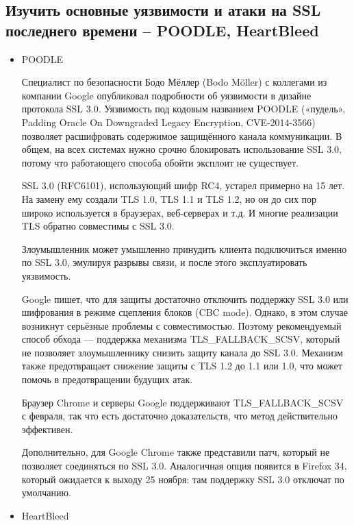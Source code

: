 \documentclass[11pt, a4paper]{article}		%
\begin{document}

\subsection{Изучить основные уязвимости и атаки на SSL последнего времени – POODLE, HeartBleed}

\begin{itemize}

\item POODLE 

Специалист по безопасности Бодо Мёллер (Bodo Möller) с коллегами из компании Google опубликовал подробности об уязвимости в дизайне протокола SSL 3.0. Уязвимость под кодовым названием POODLE («пудель», Padding Oracle On Downgraded Legacy Encryption, CVE-2014-3566) позволяет расшифровать содержимое защищённого канала коммуникации. В общем, на всех системах нужно срочно блокировать использование SSL 3.0, потому что работающего способа обойти эксплоит не существует.

SSL 3.0 (RFC6101), использующий шифр RC4, устарел примерно на 15 лет. На замену ему создали TLS 1.0, TLS 1.1 и TLS 1.2, но он до сих пор широко используется в браузерах, веб-серверах и т.д. И многие реализации TLS обратно совместимы с SSL 3.0.

Злоумышленник может умышленно принудить клиента подключиться именно по SSL 3.0, эмулируя разрывы связи, и после этого эксплуатировать уязвимость.

Google пишет, что для защиты достаточно отключить поддержку SSL 3.0 или шифрования в режиме сцепления блоков (CBC mode). Однако, в этом случае возникнут серьёзные проблемы с совместимостью. Поэтому рекомендуемый способ обхода — поддержка механизма TLS\_FALLBACK\_SCSV, который не позволяет злоумышленнику снизить защиту канала до SSL 3.0. Механизм также предотвращает снижение защиты с TLS 1.2 до 1.1 или 1.0, что может помочь в предотвращении будущих атак.

Браузер Chrome и серверы Google поддерживают TLS\_FALLBACK\_SCSV с февраля, так что есть достаточно доказательств, что метод действительно эффективен.

Дополнительно, для Google Chrome также представили патч, который не позволяет соединяться по SSL 3.0. Аналогичная опция появится в Firefox 34, который ожидается к выходу 25 ноября: там поддержку SSL 3.0 отключат по умолчанию.

\item HeartBleed


\end{itemize}
\end{document}
